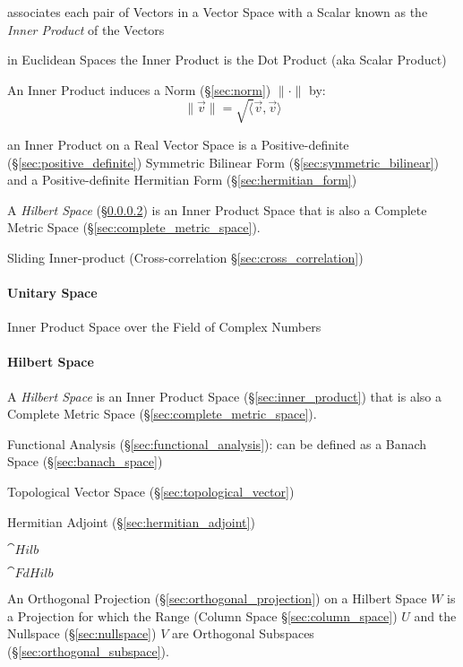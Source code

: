 associates each pair of Vectors in a Vector Space with a Scalar known
as the \emph{Inner Product} of the Vectors

in Euclidean Spaces the Inner Product is the Dot Product (aka Scalar Product)

An Inner Product induces a Norm (\S\ref{sec:norm}) $\|\cdot\|$ by:
\[
  \|\vec{v}\| = \sqrt\langle{\vec{v},\vec{v}}\rangle
\]

an Inner Product on a Real Vector Space is a Positive-definite
(\S\ref{sec:positive_definite}) Symmetric Bilinear Form
(\S\ref{sec:symmetric_bilinear}) and a Positive-definite Hermitian Form
(\S\ref{sec:hermitian_form})

A \emph{Hilbert Space} (\S\ref{sec:hilbert_space}) is an Inner Product Space
that is also a Complete Metric Space (\S\ref{sec:complete_metric_space}).

\fist Sliding Inner-product (Cross-correlation \S\ref{sec:cross_correlation})



\paragraph{Unitary Space}\label{sec:unitary_space}\hfill

Inner Product Space over the Field of Complex Numbers



\paragraph{Hilbert Space}\label{sec:hilbert_space}\hfill


A \emph{Hilbert Space} is an Inner Product Space (\S\ref{sec:inner_product})
that is also a Complete Metric Space (\S\ref{sec:complete_metric_space}).

Functional Analysis (\S\ref{sec:functional_analysis}): can be defined
as a Banach Space (\S\ref{sec:banach_space})

Topological Vector Space (\S\ref{sec:topological_vector})

Hermitian Adjoint (\S\ref{sec:hermitian_adjoint})

$\cat{Hilb}$

$\cat{FdHilb}$

An Orthogonal Projection (\S\ref{sec:orthogonal_projection}) on a Hilbert Space
$W$ is a Projection for which the Range (Column Space \S\ref{sec:column_space})
$U$ and the Nullspace (\S\ref{sec:nullspace}) $V$ are Orthogonal Subspaces
(\S\ref{sec:orthogonal_subspace}).



